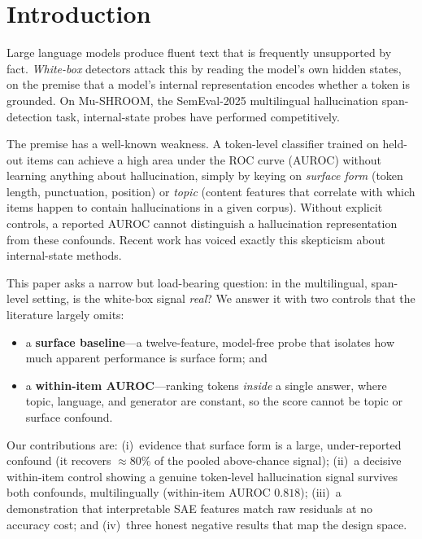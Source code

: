 \documentclass[conference]{IEEEtran}
\begin{document}
\section{Introduction}
Large language models produce fluent text that is frequently unsupported by
fact. \emph{White-box} detectors attack this by reading the model's own hidden
states, on the premise that a model's internal representation encodes whether a
token is grounded. On Mu-SHROOM, the SemEval-2025 multilingual hallucination
span-detection task, internal-state probes have performed competitively.

The premise has a well-known weakness. A token-level classifier trained on
held-out items can achieve a high area under the ROC curve (AUROC) without
learning anything about hallucination, simply by keying on \emph{surface form}
(token length, punctuation, position) or \emph{topic} (content features that
correlate with which items happen to contain hallucinations in a given corpus).
Without explicit controls, a reported AUROC cannot distinguish a hallucination
representation from these confounds. Recent work has voiced exactly this
skepticism about internal-state methods.

This paper asks a narrow but load-bearing question: in the multilingual,
span-level setting, is the white-box signal \emph{real}? We answer it with two
controls that the literature largely omits:
\begin{itemize}
\item a \textbf{surface baseline}---a twelve-feature, model-free probe that
isolates how much apparent performance is surface form; and
\item a \textbf{within-item AUROC}---ranking tokens \emph{inside} a single
answer, where topic, language, and generator are constant, so the score cannot
be topic or surface confound.
\end{itemize}

Our contributions are: (i)~evidence that surface form is a large,
under-reported confound (it recovers $\approx 80\%$ of the pooled above-chance
signal); (ii)~a decisive within-item control showing a genuine token-level
hallucination signal survives both confounds, multilingually
(within-item AUROC $0.818$); (iii)~a demonstration that interpretable SAE
features match raw residuals at no accuracy cost; and (iv)~three honest
negative results that map the design space.
\end{document}
